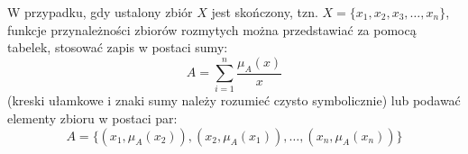 \documentclass[a4paper,12pt]{article}
\theoremstyle{definition}
\begin{document}
W przypadku, gdy ustalony zbiór $X$ jest skończony, tzn. \(X=\{x_1,x_2,x_3,\dots,x_n\}\), funkcje przynależności zbiorów rozmytych można przedstawiać za pomocą tabelek, stosować zapis w postaci sumy:
\begin{equation}
A=\sum_{i=1}^n{\frac{\mu_A(x)}{x}}
\end{equation}
(kreski ułamkowe i znaki sumy należy rozumieć czysto symbolicznie) lub podawać elementy zbioru w postaci par:
\begin{equation}
A=\{
(x_1,\mu_A(x_2)),
(x_2,\mu_A(x_1)),
\dots,
(x_n,\mu_A(x_n))
\}
\end{equation}
\end{document}
